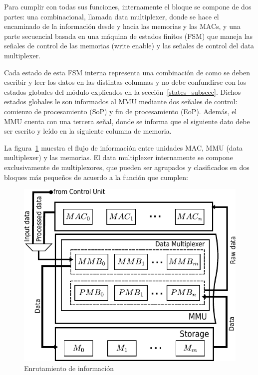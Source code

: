 Para cumplir con todas sus funciones, internamente el bloque se
compone de dos partes: una combinacional, llamada data multiplexer, donde se
hace el encaminado de la información desde y hacia las memorias y las MACs, y
una parte secuencial basada en una máquina de estados finitos (FSM) que maneja
las señales de control de las memorias (write enable) y las señales de control
del data multiplexer.

Cada estado de esta FSM interna representa una combinación de como se deben
escribir y leer los datos en las distintas columnas y no debe confundirse con
los estados globales del módulo explicados en la sección~\ref{states_subsecc}. Dichos
estados globales le son informados al MMU mediante dos señales de control:
comienzo de procesamiento (SoP) y fin de procesamiento (EoP). Además, el MMU
cuenta con una tercera señal, donde se informa que el siguiente dato debe ser
escrito y leído en la siguiente columna de memoria.

La figura~\ref{mmu_routing} muestra el flujo de información entre unidades MAC,
MMU (data multiplexer) y las memorias. El data multiplexer internamente se
compone exclusivamente de multiplexores, que pueden ser agrupados y clasificados
en dos bloques más pequeños de acuerdo a la función que cumplen:

\begin{figure}
\centering
\includegraphics[scale=0.9]{muxes}
\caption{Enrutamiento de información}\label{mmu_routing}
\end{figure}

